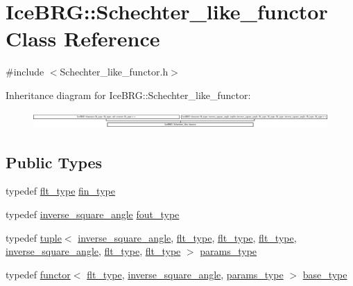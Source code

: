\hypertarget{classIceBRG_1_1Schechter__like__functor}{}\section{Ice\+B\+R\+G\+:\+:Schechter\+\_\+like\+\_\+functor Class Reference}
\label{classIceBRG_1_1Schechter__like__functor}


{\ttfamily \#include $<$Schechter\+\_\+like\+\_\+functor.\+h$>$}

Inheritance diagram for Ice\+B\+R\+G\+:\+:Schechter\+\_\+like\+\_\+functor\+:\begin{figure}[H]
\begin{center}
\leavevmode
\includegraphics[height=0.639269cm]{classIceBRG_1_1Schechter__like__functor}
\end{center}
\end{figure}
\subsection*{Public Types}
\begin{DoxyCompactItemize}
\item 
typedef \hyperlink{lib_2IceBRG__main_2common_8h_ad0f130a56eeb944d9ef2692ee881ecc4}{flt\+\_\+type} \hyperlink{classIceBRG_1_1Schechter__like__functor_aa444797b63bb4d4b01859b9c6a5d528e}{fin\+\_\+type}
\item 
typedef \hyperlink{namespaceIceBRG_a26efaff9c9adf346c7d09d0b714731f6}{inverse\+\_\+square\+\_\+angle} \hyperlink{classIceBRG_1_1Schechter__like__functor_a90c760c2efcd3ae2b3a7f733672b18ed}{fout\+\_\+type}
\item 
typedef \hyperlink{namespaceIceBRG_a5148ef56bdd96f27ce60555b6aaa979e}{tuple}$<$ \hyperlink{namespaceIceBRG_a26efaff9c9adf346c7d09d0b714731f6}{inverse\+\_\+square\+\_\+angle}, \hyperlink{lib_2IceBRG__main_2common_8h_ad0f130a56eeb944d9ef2692ee881ecc4}{flt\+\_\+type}, \hyperlink{lib_2IceBRG__main_2common_8h_ad0f130a56eeb944d9ef2692ee881ecc4}{flt\+\_\+type}, \hyperlink{lib_2IceBRG__main_2common_8h_ad0f130a56eeb944d9ef2692ee881ecc4}{flt\+\_\+type}, \hyperlink{namespaceIceBRG_a26efaff9c9adf346c7d09d0b714731f6}{inverse\+\_\+square\+\_\+angle}, \hyperlink{lib_2IceBRG__main_2common_8h_ad0f130a56eeb944d9ef2692ee881ecc4}{flt\+\_\+type}, \hyperlink{lib_2IceBRG__main_2common_8h_ad0f130a56eeb944d9ef2692ee881ecc4}{flt\+\_\+type} $>$ \hyperlink{classIceBRG_1_1Schechter__like__functor_a5a7c7522b680f34ea2004184ffd099f7}{params\+\_\+type}
\item 
typedef \hyperlink{classIceBRG_1_1functor}{functor}$<$ \hyperlink{lib_2IceBRG__main_2common_8h_ad0f130a56eeb944d9ef2692ee881ecc4}{flt\+\_\+type}, \hyperlink{namespaceIceBRG_a26efaff9c9adf346c7d09d0b714731f6}{inverse\+\_\+square\+\_\+angle}, \hyperlink{classIceBRG_1_1Schechter__like__functor_a5a7c7522b680f34ea2004184ffd099f7}{params\+\_\+type} $>$ \hyperlink{classIceBRG_1_1Schechter__like__functor_a919adc2367dc8f3b9939f3ae87d14315}{base\+\_\+type}
\end{DoxyCompactItemize}
